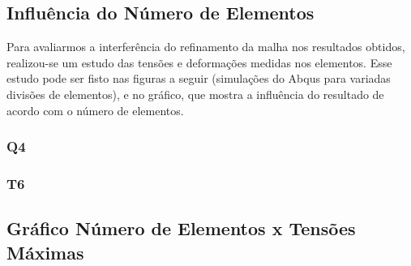 \subsection*{Influência do Número de Elementos}


\begin{DoxyItemize}
\item Para avaliarmos a interferência do refinamento da malha nos resultados obtidos, realizou-\/se um estudo das tensões e deformações medidas nos elementos. Esse estudo pode ser fisto nas figuras a seguir (simulações do Abqus para variadas divisões de elementos), e no gráfico, que mostra a influência do resultado de acordo com o número de elementos.
\end{DoxyItemize}

\subsubsection*{}

\subsubsection*{Q4}

\subsubsection*{}

\subsubsection*{}

\subsubsection*{T6}

\subsubsection*{}

\subsubsection*{}

\subsection*{Gráfico Número de Elementos x Tensões Máximas}

